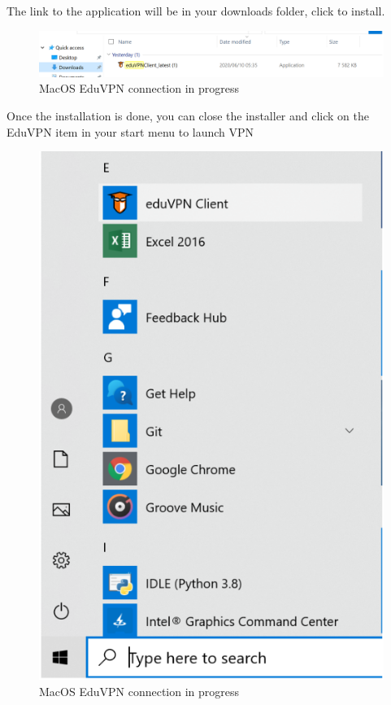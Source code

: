 The link to the application will be in your downloads folder, click to install.
\begin{figure}[!thb]
	\centering
	\includegraphics[scale=0.23]{Chapters/images/image8.png}
	
	\caption{MacOS EduVPN connection in progress }
	\label{fig:image8}
\end{figure}
Once the installation is done, you can close the installer and click on the EduVPN item in your start menu to launch VPN
\begin{figure}[!thb]
	\centering
	\includegraphics[scale=0.8]{Chapters/images/image28.png}
	
	\caption{MacOS EduVPN connection in progress }
	\label{fig:image28}
\end{figure}

